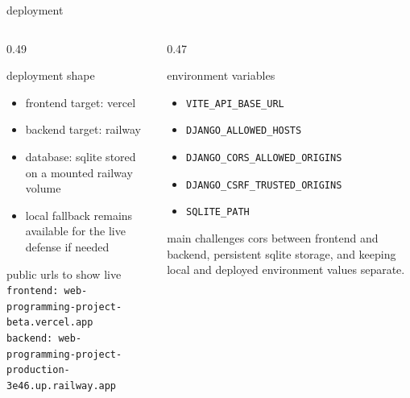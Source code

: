 \documentclass[aspectratio=169,11pt]{beamer}
\begin{document}
\begin{frame}{deployment}
  \small
  \begin{columns}[T]
    \begin{column}{0.49\textwidth}
      \begin{block}{deployment shape}
        \begin{itemize}
          \item frontend target: vercel
          \item backend target: railway
          \item database: sqlite stored on a mounted railway volume
          \item local fallback remains available for the live defense if needed
        \end{itemize}
      \end{block}

      \begin{exampleblock}{public urls to show live}
        \texttt{frontend: web-programming-project-beta.vercel.app}\\[0.25em]
        \texttt{backend: web-programming-project-production-3e46.up.railway.app}
      \end{exampleblock}
    \end{column}
    \begin{column}{0.47\textwidth}
      \begin{block}{environment variables}
        \begin{itemize}
          \item \texttt{VITE\_API\_BASE\_URL}
          \item \texttt{DJANGO\_ALLOWED\_HOSTS}
          \item \texttt{DJANGO\_CORS\_ALLOWED\_ORIGINS}
          \item \texttt{DJANGO\_CSRF\_TRUSTED\_ORIGINS}
          \item \texttt{SQLITE\_PATH}
        \end{itemize}
      \end{block}

      \begin{alertblock}{main challenges}
        cors between frontend and backend, persistent sqlite storage,
        and keeping local and deployed environment values separate.
      \end{alertblock}
    \end{column}
  \end{columns}
\end{frame}
\end{document}
